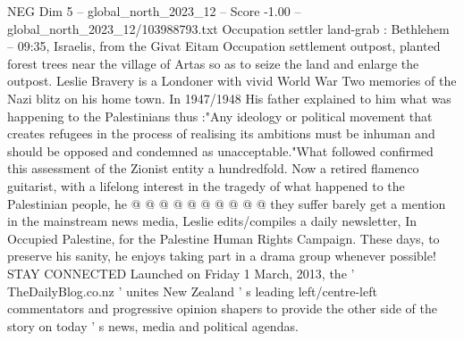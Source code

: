 \begin{textsample}{NEG Dim 5 – global\_north\_2023\_12 – Score -1.00 – global\_north\_2023\_12/103988793.txt}
Occupation settler land-grab : Bethlehem -- 09:35, Israelis, from the Givat Eitam Occupation settlement outpost, planted forest trees near the village of Artas so as to seize the land and enlarge the outpost.
Leslie Bravery is a Londoner with vivid World War Two memories of the Nazi blitz on his home town.
In 1947/1948 His father explained to him what was happening to the Palestinians thus :"Any ideology or political movement that creates refugees in the process of realising its ambitions must be inhuman and should be opposed and condemned as unacceptable."What followed confirmed this assessment of the Zionist entity a hundredfold.
Now a retired flamenco guitarist, with a lifelong interest in the tragedy of what happened to the Palestinian people, he @ @ @ @ @ @ @ @ @ @ they suffer barely get a mention in the mainstream news media, Leslie edits/compiles a daily newsletter, In Occupied Palestine, for the Palestine Human Rights Campaign.
These days, to preserve his sanity, he enjoys taking part in a drama group whenever possible!
STAY CONNECTED Launched on Friday 1 March, 2013, the ' TheDailyBlog.co.nz ' unites New Zealand ' s leading left/centre-left commentators and progressive opinion shapers to provide the other side of the story on today ' s news, media and political agendas.

\end{textsample}
